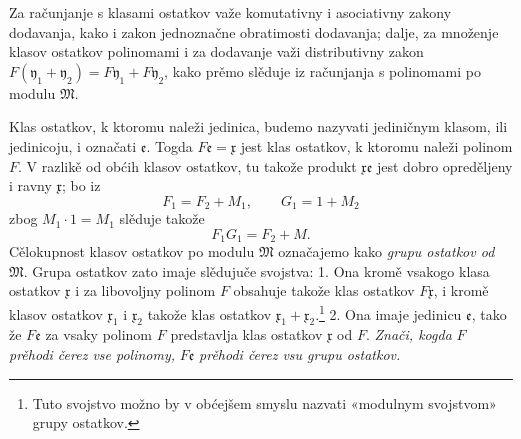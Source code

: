 \documentclass[11pt]{article}
\providecommand{\mM}{\mathfrak M}
\providecommand{\mx}{\mathfrak x}
\providecommand{\my}{\mathfrak y}
\providecommand{\me}{\mathfrak e}
\begin{document}
Za računjanje s klasami ostatkov važe komutativny i asociativny zakony dodavanja, kako i zakon jednoznačne obratimosti dodavanja; dalje, za množenje klasov ostatkov polinomami i za dodavanje važi distributivny zakon \(F(\my_1+\my_2)=F\my_1+F\my_2\), kako prěmo slěduje iz računjanja s polinomami po modulu \(\mM\).

Klas ostatkov, k ktoromu naleži jedinica, budemo nazyvati jediničnym klasom, ili jedinicoju, i označati \(\me\). Togda \(F\me=\mx\) jest klas ostatkov, k ktoromu naleži polinom \(F\). V razlikě od obćih klasov ostatkov, tu takože produkt \(\mx\me\) jest dobro opreděljeny i ravny \(\mx\); bo iz
\[
 F_1=F_2+M_1,\qquad G_1=1+M_2
\]
zbog \(M_1\cdot1=M_1\) slěduje takože
\[
 F_1G_1=F_2+M.
\]
Cělokupnost klasov ostatkov po modulu \(\mM\) označajemo kako \textit{grupu ostatkov od} \(\mM\). Grupa ostatkov zato imaje slědujuče svojstva: 1. Ona kromě vsakogo klasa ostatkov \(\mx\) i za libovoljny polinom \(F\) obsahuje takože klas ostatkov \(F\mx\), i kromě klasov ostatkov \(\mx_1\) i \(\mx_2\) takože klas ostatkov \(\mx_1+\mx_2\).\footnote{Tuto svojstvo možno by v obćejšem smyslu nazvati «modulnym svojstvom» grupy ostatkov.} 2. Ona imaje jedinicu \(\me\), tako že \(F\me\) za vsaky polinom \(F\) predstavlja klas ostatkov \(\mx\) od \(F\). \textit{Znači, kogda} \(F\) \textit{prěhodi čerez vse polinomy,} \(F\me\) \textit{prěhodi čerez vsu grupu ostatkov.}
\end{document}

